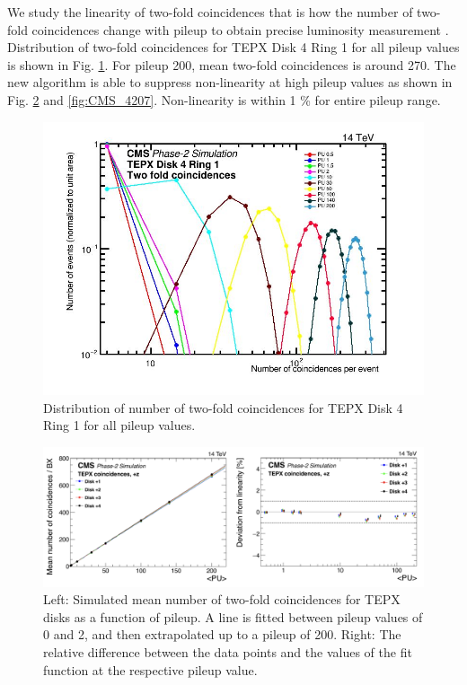 
We study the linearity of two-fold coincidences that is how the number of two-fold coincidences change with pileup to obtain precise luminosity measurement \cite{sehrawat2022optimisation}. Distribution of two-fold coincidences for TEPX Disk 4 Ring 1 for all pileup values is shown in Fig. \ref{fig:tepx_coin_allPU}. For pileup 200, mean two-fold coincidences is around 270. The new algorithm is able to suppress non-linearity at high pileup values as shown in Fig.  \ref{fig:CMS_420}  and \ref{fig:CMS_4207}. Non-linearity is within 1 \% for entire pileup range.

\begin{figure}[H]
  \centering
  \includegraphics[width=0.7\columnwidth]{ashish_thesis/tepx_D4R1_coin_allpu_1.png}
  \caption[TEPX D4R1 Two-Fold Coincidences All Pileup]{Distribution of number of two-fold coincidences for TEPX Disk 4 Ring 1 for all pileup values.}
  \label{fig:tepx_coin_allPU}
\end{figure}


\begin{figure}[H]
  \centering
  \includegraphics[width=1\columnwidth]{ashish_thesis/michigan_1.png}
  \caption[TEPX two-fold coincidences linear fit per disk]{\onehalfspacing Left: Simulated mean number of two-fold coincidences for TEPX disks as a function of pileup. A line is fitted between pileup values of 0 and 2, and then extrapolated up to a pileup of 200. Right: The relative difference between the data points and the values of the fit function at the respective pileup value.}
  \label{fig:CMS_420}
\end{figure}


